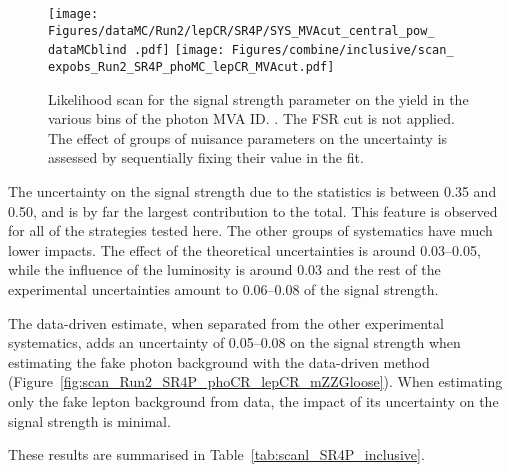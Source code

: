\begin{figure}
  \centering
  \texttt{[image: Figures/dataMC/Run2/lepCR/SR4P/SYS\_MVAcut\_central\_pow\_\\dataMCblind .pdf]}
  \hfill
  \texttt{[image: Figures/combine/inclusive/scan\_\\expobs\_Run2\_SR4P\_phoMC\_lepCR\_MVAcut.pdf]}
  \caption{Likelihood scan for the signal strength parameter
    on the yield in the various bins of the photon MVA ID.
    .
    The FSR cut is not applied.
    The effect of groups of nuisance parameters on the uncertainty is assessed by sequentially fixing their value in the fit.
  }
  \label{fig:scan_Run2_SR4P_phoMC_lepCR_MVAcut}
\end{figure}

The uncertainty on the signal strength due to the statistics is between 0.35 and 0.50,
and is by far the largest contribution to the total.
This feature is observed for all of the strategies tested here.
The other groups of systematics have much lower impacts.
The effect of the theoretical uncertainties is around 0.03--0.05,
while the influence of the luminosity is around 0.03
and the rest of the experimental uncertainties amount to 0.06--0.08 of the signal strength.

The data-driven estimate, when separated from the other experimental systematics,
adds an uncertainty of 0.05--0.08 on the signal strength when estimating the fake photon background
with the data-driven method (Figure~\ref{fig:scan_Run2_SR4P_phoCR_lepCR_mZZGloose}).
When estimating only the fake lepton background from data, the impact of its uncertainty on the signal strength is minimal.

These results are summarised in Table~\ref{tab:scanl_SR4P_inclusive}.

